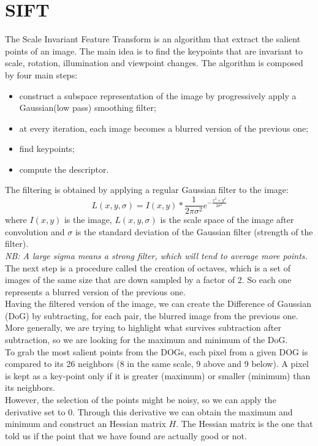 \section{SIFT}
The Scale Invariant Feature Transform is an algorithm that extract the salient points of an image.
The main idea is to find the keypoints that are invariant to scale, rotation, illumination and viewpoint changes.
The algorithm is composed by four main steps:
\begin{itemize}
    \item construct a subspace representation of the image by progressively apply a Gaussian(low pass) smoothing filter;
    \item at every iteration, each image becomes a blurred version of the previous one;
    \item find keypoints;
    \item compute the descriptor.
\end{itemize}
The filtering is obtained by applying a regular Gaussian filter to the image:
\[
    L(x,y,\sigma) = I(x,y) * \frac{1}{2\pi\sigma^2}e^{-\frac{x^2+y^2}{2\sigma^2}}
\]
where $I(x,y)$ is the image, $L(x,y,\sigma)$ is the scale space of the image after convolution and $\sigma$ is the standard deviation of the Gaussian filter (strength of the filter).
\\\textit{NB: A large sigma means a strong filter, which will tend to average more points.}
\\
The next step is a procedure called the creation of octaves, which is a set of images of the same size that are down sampled by a factor of 2.
So each one represents a blurred version of the previous one.
\\Having the filtered version of the image, we can create the Difference of Gaussian (DoG) by subtracting, for each pair, the blurred image from the previous one.
More generally, we are trying to highlight what survives subtraction after subtraction, so we are looking for the maximum and minimum of the DoG.
\\To grab the most salient points from the DOGs, each pixel from a given DOG is compared to its 26 neighbors (8 in the same scale, 9 above and 9 below).
A pixel is kept as a key-point only if it is greater (maximum) or smaller (minimum) than its neighbors.
\\However, the selection of the points might be noisy, so we can apply the derivative set to $0$. 
Through this derivative we can obtain the maximum and minimum and construct an Hessian matrix $H$.
The Hessian matrix is the one that told us if the point that we have found are actually good or not.

